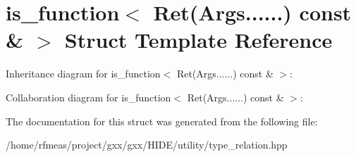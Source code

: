 \hypertarget{structis__function_3_01Ret_07Args_8_8_8_8_8_8_08_01const_01_6_01_4}{}\section{is\+\_\+function$<$ Ret(Args......) const \& $>$ Struct Template Reference}
\label{structis__function_3_01Ret_07Args_8_8_8_8_8_8_08_01const_01_6_01_4}


Inheritance diagram for is\+\_\+function$<$ Ret(Args......) const \& $>$\+:


Collaboration diagram for is\+\_\+function$<$ Ret(Args......) const \& $>$\+:


The documentation for this struct was generated from the following file\+:\begin{DoxyCompactItemize}
\item 
/home/rfmeas/project/gxx/gxx/\+H\+I\+D\+E/utility/type\+\_\+relation.\+hpp\end{DoxyCompactItemize}
